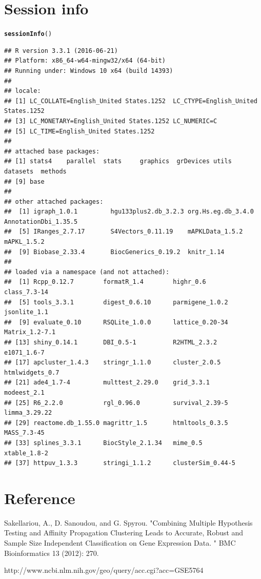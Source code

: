 \documentclass[12pt]{article}\usepackage[]{graphicx}\usepackage[usenames,dvipsnames]{color}
\makeatletter
\newcommand{\hlstd}[1]{\textcolor[rgb]{0.345,0.345,0.345}{#1}}%
\newcommand{\hlkwd}[1]{\textcolor[rgb]{0.737,0.353,0.396}{\textbf{#1}}}%
\newenvironment{kframe}{%
 \def\at@end@of@kframe{}%
 \ifinner\ifhmode%
  \def\at@end@of@kframe{\end{minipage}}%
  \begin{minipage}{\columnwidth}%
 \fi\fi%
 \def\FrameCommand##1{\hskip\@totalleftmargin \hskip-\fboxsep
 \colorbox{shadecolor}{##1}\hskip-\fboxsep
     \hskip-\linewidth \hskip-\@totalleftmargin \hskip\columnwidth}%
 \MakeFramed {\advance\hsize-\width
   \@totalleftmargin\z@ \linewidth\hsize
   \@setminipage}}%
 {\par\unskip\endMakeFramed%
 \at@end@of@kframe}
\newenvironment{knitrout}{}{} %
\makeatother
\begin{document}
\section{Session info}
\begin{knitrout}
\color{fgcolor}\begin{kframe}
\begin{alltt}
\hlkwd{sessionInfo}\hlstd{()}
\end{alltt}
\begin{verbatim}
## R version 3.3.1 (2016-06-21)
## Platform: x86_64-w64-mingw32/x64 (64-bit)
## Running under: Windows 10 x64 (build 14393)
## 
## locale:
## [1] LC_COLLATE=English_United States.1252  LC_CTYPE=English_United States.1252   
## [3] LC_MONETARY=English_United States.1252 LC_NUMERIC=C                          
## [5] LC_TIME=English_United States.1252    
## 
## attached base packages:
## [1] stats4    parallel  stats     graphics  grDevices utils     datasets  methods  
## [9] base     
## 
## other attached packages:
##  [1] igraph_1.0.1         hgu133plus2.db_3.2.3 org.Hs.eg.db_3.4.0   AnnotationDbi_1.35.5
##  [5] IRanges_2.7.17       S4Vectors_0.11.19    mAPKLData_1.5.2      mAPKL_1.5.2         
##  [9] Biobase_2.33.4       BiocGenerics_0.19.2  knitr_1.14          
## 
## loaded via a namespace (and not attached):
##  [1] Rcpp_0.12.7        formatR_1.4        highr_0.6          class_7.3-14      
##  [5] tools_3.3.1        digest_0.6.10      parmigene_1.0.2    jsonlite_1.1      
##  [9] evaluate_0.10      RSQLite_1.0.0      lattice_0.20-34    Matrix_1.2-7.1    
## [13] shiny_0.14.1       DBI_0.5-1          R2HTML_2.3.2       e1071_1.6-7       
## [17] apcluster_1.4.3    stringr_1.1.0      cluster_2.0.5      htmlwidgets_0.7   
## [21] ade4_1.7-4         multtest_2.29.0    grid_3.3.1         modeest_2.1       
## [25] R6_2.2.0           rgl_0.96.0         survival_2.39-5    limma_3.29.22     
## [29] reactome.db_1.55.0 magrittr_1.5       htmltools_0.3.5    MASS_7.3-45       
## [33] splines_3.3.1      BiocStyle_2.1.34   mime_0.5           xtable_1.8-2      
## [37] httpuv_1.3.3       stringi_1.1.2      clusterSim_0.44-5
\end{verbatim}
\end{kframe}
\end{knitrout}

\section{Reference}
\begin{list}{}{\itemindent=-1.0cm}

\item Sakellariou, A., D. Sanoudou, and G. Spyrou. "Combining Multiple 
Hypothesis Testing and Affinity Propagation Clustering Leads to Accurate, 
Robust and Sample Size Independent Classification on Gene Expression Data.
" BMC Bioinformatics 13 (2012): 270.
\item http://www.ncbi.nlm.nih.gov/geo/query/acc.cgi?acc=GSE5764

\end{list}
\end{document}
